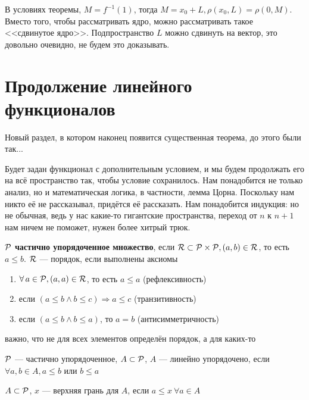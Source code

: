 \documentclass[document]{subfiles}
\begin{document}
\begin{remark}
    В условиях теоремы, $M = f^{-1}(1)$, тогда $M = x_0 + L, \rho(x_0, L) = \rho(0, M)$. Вместо того, чтобы рассматривать ядро, можно рассматривать такое <<сдвинутое ядро>>.
    Подпространство $L$ можно сдвинуть на  вектор, это довольно очевидно, не будем это доказывать.
\end{remark}

\section{Продолжение линейного функционалов}

Новый раздел, в котором наконец появится существенная теорема, до этого были так...

Будет задан функционал с дополнительным условием, и мы будем продолжать его на всё пространство так, чтобы условие сохранилось. Нам понадобится не только анализ, но и математическая логика, в частности, лемма Цорна. Поскольку 
нам никто её не рассказывал, придётся её рассказать.
Нам понадобится индукция: но не обычная, ведь у нас какие-то гигантские пространства, переход от $n$ к $n+1$ нам ничем не поможет, нужен более хитрый трюк.

\begin{definition}
    $\mathcal{P}$ \textbf{ частично упорядоченное множество}, если $\mathcal{R} \subset \mathcal{P} \times \mathcal{P}, (a,b) \in \mathcal{R}$, то есть $a \leq b$. $\mathcal{R}$ --- порядок, если выполнены аксиомы 
    \begin{enumerate}
        \item $\forall a \in \Rho, (a,a) \in \R$, то есть $a \leq a$ (рефлексивность)
        \item если $(a \leq b \land b \leq c) \Rightarrow a \leq c$ (транзитивность)
        \item если $(a \leq b \land b \leq a)$, то $a = b$ (антисимметричность)
    \end{enumerate}
    важно, что не для всех элементов определён порядок, а для каких-то
\end{definition}

\begin{definition}
    $\mathcal{P}$ --- частично упорядоченное, $A \subset \mathcal{P}$, $A$ --- линейно упорядочено, если $\forall a,b \in A, a \leq b$ или $b \leq a$
\end{definition}

\begin{definition}
    $A \subset \mathcal{P}$, $x$ --- верхняя грань для $A$, если $a \leq x \: \forall a \in A$
\end{definition}
\end{document}
